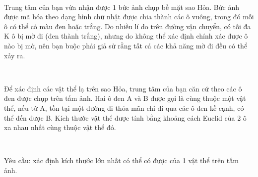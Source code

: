  

Trung tâm của bạn vừa nhận được 1 bức ảnh chụp bề mặt sao Hỏa. Bức ảnh được mã hóa theo dạng hình chữ nhật được chia thành các ô vuông, trong đó mỗi ô có thể có màu đen hoặc trắng. Do nhiều lí do trên đường vận chuyển, có tối đa K ô bị mờ đi (đen thành trắng), nhưng do không thể xác định chính xác được ô nào bị mờ, nên bạn buộc phải giả sử rằng tất cả các khả năng mờ đi đều có thể xảy ra.

 

Để xác định các vật thể lạ trên sao Hỏa, trung tâm của bạn căn cứ theo các ô đen được chụp trên tấm ảnh. Hai ô đen A và B được gọi là cùng thuộc một vật thể, nếu từ A, tồn tại một đường đi thỏa mãn chỉ đi qua các ô đen kề cạnh, có thể đến được B. Kích thước vật thể được tính bằng khoảng cách Euclid của 2 ô xa nhau nhất cùng thuộc vật thể đó.

 

Yêu cầu: xác định kích thước lớn nhất có thể có được của 1 vật thể trên tấm ảnh.

\